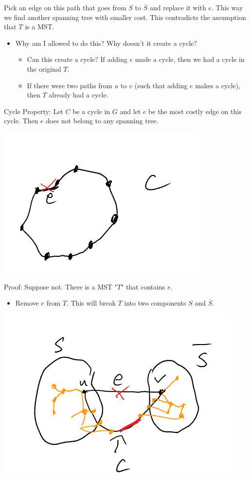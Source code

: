 \documentclass[11pt]{article}
\begin{document}
Pick an edge on this path that goes from \(S\) to \(\overline{S}\) and replace it with \(e\). This way we find another spanning tree with smaller cost. This contradicts the assumption that \(T\) is a MST.
\begin{itemize}
\item Why am I allowed to do this? Why doesn't it create a cycle?
\begin{itemize}
\item Can this create a cycle? If adding \(e\) made a cycle, then we had a cycle in the original \(T\).
\item If there were two paths from \(u\) to \(v\) (such that adding \(e\) makes a cycle), then \(T\) already had a cycle.
\end{itemize}
\end{itemize}
Cycle Property: Let \(C\) be a cycle in \(G\) and let \(e\) be the most costly edge on this cycle. Then \(e\) does not belong to any spanning tree.
\begin{center}
\includegraphics[width=.9\linewidth]{./Images/i49.png}
\end{center}
Proof: Suppose not. There is a MST "\(T\)" that contains \(e\).
\begin{itemize}
\item Remove \(e\) from \(T\). This will break \(T\) into two components \(S\) and \(\overline{S}\).
\end{itemize}
\begin{center}
\includegraphics[width=.9\linewidth]{./Images/i50.png}
\end{center}
\end{document}
